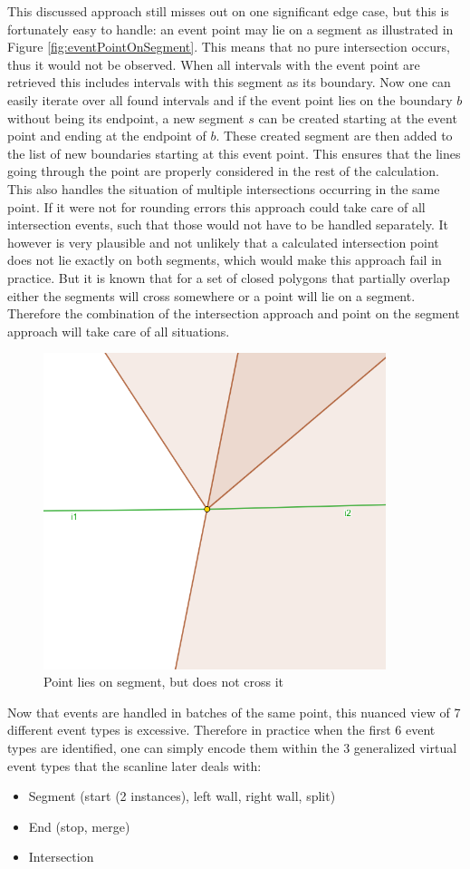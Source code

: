 \documentclass[12pt]{article}
\begin{document}
This discussed approach still misses out on one significant edge case, but this is fortunately easy to handle: an event point may lie on a segment as illustrated in Figure \ref{fig:eventPointOnSegment}. This means that no pure intersection occurs, thus it would not be observed. When all intervals with the event point are retrieved this includes intervals with this segment as its boundary. Now one can easily iterate over all found intervals and if the event point lies on the boundary $b$ without being its endpoint, a new segment $s$ can be created starting at the event point and ending at the endpoint of $b$. These created segment are then added to the list of new boundaries starting at this event point. This ensures that the lines going through the point are properly considered in the rest of the calculation. This also handles the situation of multiple intersections occurring in the same point. If it were not for rounding errors this approach could take care of all intersection events, such that those would not have to be handled separately. It however is very plausible and not unlikely that a calculated intersection point does not lie exactly on both segments, which would make this approach fail in practice. But it is known that for a set of closed polygons that partially overlap either the segments will cross somewhere or a point will lie on a segment. Therefore the combination of the intersection approach and point on the segment approach will take care of all situations. 
\begin{figure}[H]
    \centering
    \includegraphics[width=10cm]{Images/intersection_pointOnSegment.png}
    \caption{Point lies on segment, but does not cross it}
    \label{fig:intersectionScanline}
\end{figure}

Now that events are handled in batches of the same point, this nuanced view of 7 different event types is excessive. Therefore in practice when the first 6 event types are identified, one can simply encode them within the 3 generalized virtual event types that the scanline later deals with:
\begin{itemize}
    \item Segment (start (2 instances), left wall, right wall, split)
    \item End (stop, merge)
    \item Intersection
\end{itemize}
\end{document}
